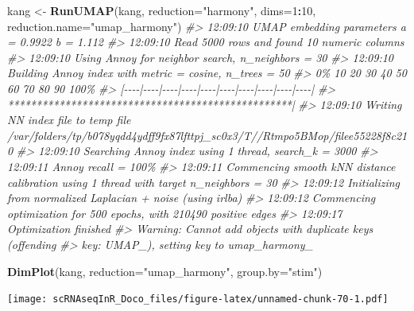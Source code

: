 \documentclass[
]{book}
\newenvironment{Shaded}{\begin{snugshade}}{\end{snugshade}}
\newcommand{\AttributeTok}[1]{\textcolor[rgb]{0.13,0.29,0.53}{#1}}
\newcommand{\CommentTok}[1]{\textcolor[rgb]{0.56,0.35,0.01}{\textit{#1}}}
\newcommand{\DecValTok}[1]{\textcolor[rgb]{0.00,0.00,0.81}{#1}}
\newcommand{\FunctionTok}[1]{\textcolor[rgb]{0.13,0.29,0.53}{\textbf{#1}}}
\newcommand{\NormalTok}[1]{#1}
\newcommand{\OtherTok}[1]{\textcolor[rgb]{0.56,0.35,0.01}{#1}}
\newcommand{\SpecialCharTok}[1]{\textcolor[rgb]{0.81,0.36,0.00}{\textbf{#1}}}
\newcommand{\StringTok}[1]{\textcolor[rgb]{0.31,0.60,0.02}{#1}}
\begin{document}
\begin{Shaded}
\begin{Highlighting}[]
\NormalTok{kang }\OtherTok{\textless{}{-}} \FunctionTok{RunUMAP}\NormalTok{(kang, }\AttributeTok{reduction=}\StringTok{"harmony"}\NormalTok{, }\AttributeTok{dims=}\DecValTok{1}\SpecialCharTok{:}\DecValTok{10}\NormalTok{, }\AttributeTok{reduction.name=}\StringTok{"umap\_harmony"}\NormalTok{)}
\CommentTok{\#\textgreater{} 12:09:10 UMAP embedding parameters a = 0.9922 b = 1.112}
\CommentTok{\#\textgreater{} 12:09:10 Read 5000 rows and found 10 numeric columns}
\CommentTok{\#\textgreater{} 12:09:10 Using Annoy for neighbor search, n\_neighbors = 30}
\CommentTok{\#\textgreater{} 12:09:10 Building Annoy index with metric = cosine, n\_trees = 50}
\CommentTok{\#\textgreater{} 0\%   10   20   30   40   50   60   70   80   90   100\%}
\CommentTok{\#\textgreater{} [{-}{-}{-}{-}|{-}{-}{-}{-}|{-}{-}{-}{-}|{-}{-}{-}{-}|{-}{-}{-}{-}|{-}{-}{-}{-}|{-}{-}{-}{-}|{-}{-}{-}{-}|{-}{-}{-}{-}|{-}{-}{-}{-}|}
\CommentTok{\#\textgreater{} **************************************************|}
\CommentTok{\#\textgreater{} 12:09:10 Writing NN index file to temp file /var/folders/tp/b078yqdd4ydff9fx87lfttpj\_sc0x3/T//Rtmpo5BMop/filee55228f8c210}
\CommentTok{\#\textgreater{} 12:09:10 Searching Annoy index using 1 thread, search\_k = 3000}
\CommentTok{\#\textgreater{} 12:09:11 Annoy recall = 100\%}
\CommentTok{\#\textgreater{} 12:09:11 Commencing smooth kNN distance calibration using 1 thread with target n\_neighbors = 30}
\CommentTok{\#\textgreater{} 12:09:12 Initializing from normalized Laplacian + noise (using irlba)}
\CommentTok{\#\textgreater{} 12:09:12 Commencing optimization for 500 epochs, with 210490 positive edges}
\CommentTok{\#\textgreater{} 12:09:17 Optimization finished}
\CommentTok{\#\textgreater{} Warning: Cannot add objects with duplicate keys (offending}
\CommentTok{\#\textgreater{} key: UMAP\_), setting key to \textquotesingle{}umap\_harmony\_\textquotesingle{}}

\FunctionTok{DimPlot}\NormalTok{(kang, }\AttributeTok{reduction=}\StringTok{"umap\_harmony"}\NormalTok{, }\AttributeTok{group.by=}\StringTok{"stim"}\NormalTok{)}
\end{Highlighting}
\end{Shaded}

\texttt{[image: scRNAseqInR\_Doco\_files/figure-latex/unnamed-chunk-70-1.pdf]}
\end{document}
